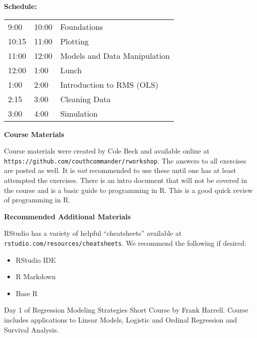 \documentclass[twocolumn]{article}
\begin{document}
\vspace*{\fill}

\pagebreak

\begin{flushleft}

\vspace*{0.5cm}

\textbf{Schedule:}

\begin{tabular}[H]{lll}
9:00 & 10:00  & Foundations \\
10:15 & 11:00 & Plotting \\
11:00 & 12:00 & Models and Data Manipulation \\
12:00 & 1:00  & Lunch \\
1:00  & 2:00  & Introduction to RMS (OLS) \\
2:15  & 3:00  & Cleaning Data \\
3:00  & 4:00  & Simulation \\
\end{tabular}

\vspace*{\fill}

\textbf{Course Materials}

Course materials were created by Cole Beck and available online at
\texttt{https://github.com/couthcommander/rworkshop}. The answers to
all exercises are posted as well. It is \emph{not} recommended to use
these until one has at least attempted the exercises. There is an intro document that will not be covered in the course and is a basic guide to programming in R. This is a good quick review of programming in R.


\vspace*{\fill}

\textbf{Recommended Additional Materials}

RStudio has a variety of helpful ``cheatsheets'' available at \texttt{rstudio.com/resources/cheatsheets}. We recommend the following if desired:

\begin{itemize}
\item RStudio IDE
\item R Markdown
\item Base R
\end{itemize}

\vspace*{\fill}

Day 1 of Regression Modeling Strategies Short Course by Frank Harrell. Course includes applications to Linear Models, Logistic and Ordinal Regression and Survival Analysis.

\end{flushleft}
\end{document}
